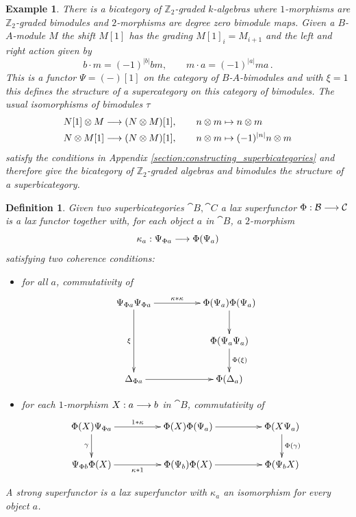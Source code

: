 \documentclass[english,letter paper,12pt,leqno]{article}
\theoremstyle{example}
\newtheorem{definition}[theorem]{Definition}
\newtheorem{example}[theorem]{Example}
\numberwithin{equation}{section}
\begin{document}
\begin{example}\label{example:bicategory_m} There is a bicategory of $\mathbb{Z}_2$-graded $k$-algebras where $1$-morphisms are $\mathbb{Z}_2$-graded bimodules and $2$-morphisms are degree zero bimodule maps. Given a $B$-$A$-module $M$ the shift $M[1]$ has the grading $M[1]_i = M_{i+1}$ and the left and right action given by
\[
b \cdot m = (-1)^{|b|} bm, \qquad m \cdot a = (-1)^{|a|} m a\,.
\]
This is a functor $\Psi = (-)[1]$ on the category of $B$-$A$-bimodules and with $\xi = 1$ this defines the structure of a supercategory on this category of bimodules. The usual isomorphisms of bimodules $\tau$
\begin{align}
N[1] \otimes M &\longrightarrow (N \otimes M)[1], \qquad n \otimes m \mapsto n \otimes m \label{eq:shift_iso_a}\\
N \otimes M[1] &\longrightarrow (N \otimes M)[1], \qquad n \otimes m \mapsto (-1)^{|n|} n \otimes m\label{eq:shift_iso_b}
\end{align}
satisfy the conditions in Appendix \ref{section:constructing_superbicategories} and therefore give the bicategory of $\mathbb{Z}_2$-graded algebras and bimodules the structure of a superbicategory.
\end{example}

\begin{definition} Given two superbicategories $\cat{B}, \cat{C}$ a \emph{lax superfunctor} $\Phi: \mathcal{B} \longrightarrow \mathcal{C}$ is a lax functor together with, for each object $a$ in $\cat{B}$, a $2$-morphism
\[
\kappa_a: \Psi_{\Phi a} \longrightarrow \Phi( \Psi_a )
\]
satisfying two coherence conditions:
\begin{itemize}
\item[(a)] for all $a$, commutativity of
\[
\xymatrix@C+2pc{
\Psi_{\Phi a} \Psi_{\Phi a} \ar[dd]_-{\xi}\ar[r]^-{\kappa * \kappa} & \Phi( \Psi_a ) \Phi( \Psi_a ) \ar[d]\\
& \Phi( \Psi_a \Psi_a ) \ar[d]^-{\Phi(\xi)}\\
\Delta_{\Phi a} \ar[r] & \Phi( \Delta_a )
}
\]
\item[(b)] for each $1$-morphism $X: a \longrightarrow b$ in $\cat{B}$, commutativity of
\[
\xymatrix@C+2pc{
\Phi(X) \Psi_{\Phi a} \ar[d]_-{\gamma} \ar[r]^-{1 * \kappa} & \Phi(X) \Phi(\Psi_a) \ar[r] & \Phi( X \Psi_a ) \ar[d]^-{\Phi(\gamma)}\\
\Psi_{\Phi b} \Phi(X) \ar[r]_-{\kappa * 1} & \Phi(\Psi_b) \Phi(X) \ar[r] & \Phi( \Psi_b X)
}
\]
\end{itemize}
A \emph{strong superfunctor} is a lax superfunctor with $\kappa_a$ an isomorphism for every object $a$.
\end{definition}
\end{document}
